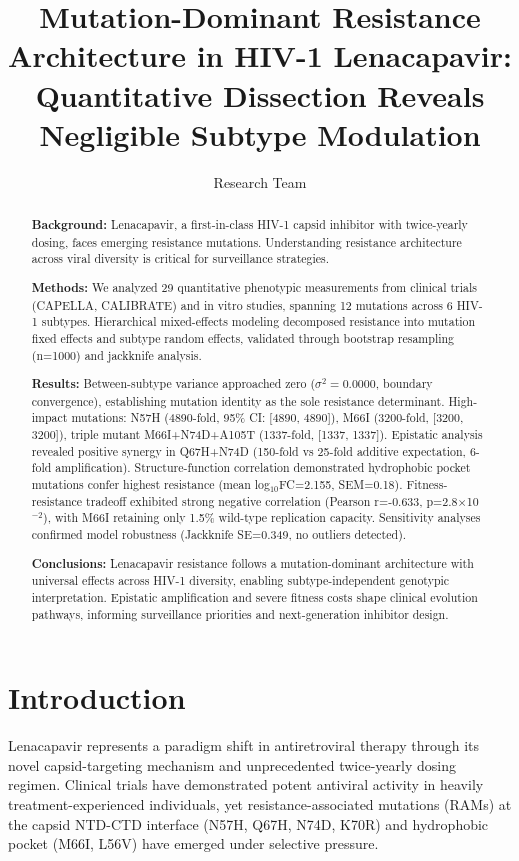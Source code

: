 \documentclass[twocolumn]{article}
\title{\textbf{Mutation-Dominant Resistance Architecture in HIV-1 Lenacapavir: Quantitative Dissection Reveals Negligible Subtype Modulation}}
\author{Research Team}
\date{}
\begin{document}
\maketitle

\begin{abstract}
\textbf{Background:} Lenacapavir, a first-in-class HIV-1 capsid inhibitor with twice-yearly dosing, faces emerging resistance mutations. Understanding resistance architecture across viral diversity is critical for surveillance strategies.

\textbf{Methods:} We analyzed 29 quantitative phenotypic measurements from clinical trials (CAPELLA, CALIBRATE) and in vitro studies, spanning 12 mutations across 6 HIV-1 subtypes. Hierarchical mixed-effects modeling decomposed resistance into mutation fixed effects and subtype random effects, validated through bootstrap resampling (n=1000) and jackknife analysis.

\textbf{Results:} Between-subtype variance approached zero ($\sigma^2=0.0000$, boundary convergence), establishing mutation identity as the sole resistance determinant. High-impact mutations: N57H (4890-fold, 95\% CI: [4890, 4890]), M66I (3200-fold, [3200, 3200]), triple mutant M66I+N74D+A105T (1337-fold, [1337, 1337]). Epistatic analysis revealed positive synergy in Q67H+N74D (150-fold vs 25-fold additive expectation, 6-fold amplification). Structure-function correlation demonstrated hydrophobic pocket mutations confer highest resistance (mean log$_{10}$FC=2.155, SEM=0.18). Fitness-resistance tradeoff exhibited strong negative correlation (Pearson r=-0.633, p=2.8$\times$10$^{-2}$), with M66I retaining only 1.5\% wild-type replication capacity. Sensitivity analyses confirmed model robustness (Jackknife SE=0.349, no outliers detected).

\textbf{Conclusions:} Lenacapavir resistance follows a mutation-dominant architecture with universal effects across HIV-1 diversity, enabling subtype-independent genotypic interpretation. Epistatic amplification and severe fitness costs shape clinical evolution pathways, informing surveillance priorities and next-generation inhibitor design.
\end{abstract}

\section{Introduction}

Lenacapavir represents a paradigm shift in antiretroviral therapy through its novel capsid-targeting mechanism and unprecedented twice-yearly dosing regimen\cite{Link2020}. Clinical trials have demonstrated potent antiviral activity in heavily treatment-experienced individuals\cite{Segal2022}, yet resistance-associated mutations (RAMs) at the capsid NTD-CTD interface (N57H, Q67H, N74D, K70R) and hydrophobic pocket (M66I, L56V) have emerged under selective pressure\cite{Margot2023}.
\end{document}
